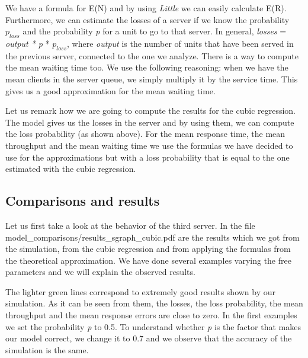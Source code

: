 \documentclass[12pt]{article}
\theoremstyle{plain}
\begin{document}
We have a formula for E(N) and by using \emph{Little} we can easily calculate
E(R). Furthermore, we can estimate the losses of a server if we know the
probability $p_{loss}$ and the probability \emph{p} for a unit to go to that
server. In general, \emph{losses} = \emph{output * p} * $p_{loss}$, where
\emph{output} is the number of units that have been served in the previous
server, connected to the one we analyze. There is a way to compute the mean
waiting time too. We use the following reasoning: when we have the mean clients
in the server queue, we simply multiply it by the service time. This gives us a
good approximation for the mean waiting time.

Let us remark how we are going to compute the results for the cubic regression.
The model gives us the losses in the server and by using them, we can compute
the loss probability (as shown above). For the mean response time, the mean
throughput and the mean waiting time we use the formulas we have decided to use
for the approximations but with a loss probability that is equal to the one
estimated with the cubic regression.

\subsection*{Comparisons and results}

Let us first take a look at the behavior of the third server. In the file
model\_comparisons/results\_sgraph\_cubic.pdf are the results which we got from the
simulation, from the cubic regression and from applying the formulas from the
theoretical approximation. We have done several examples varying the free
parameters and we will explain the observed results.  

The lighter green lines correspond to extremely good results shown by our
simulation. As it can be seen from them, the losses, the loss probability, the
mean throughput and the mean response errors are close to zero. In the first
examples we set the probability \emph{p} to 0.5. To understand whether \emph{p}
is the factor that makes our model correct, we change it to 0.7 and we observe
that the accuracy of the simulation is the same.
\end{document}
